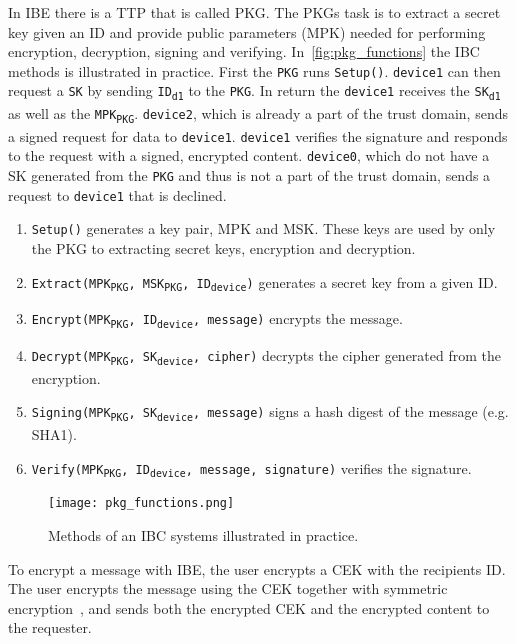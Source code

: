In \gls{IBE} there is a \gls{TTP} that is called \gls{PKG}.
The \gls{PKG}s task is to extract a secret key given an \gls{ID} and provide public parameters (\gls{MPK}) needed for performing encryption, decryption, signing and verifying. In~\autoref{fig:pkg_functions} the \gls{IBC} methods is illustrated in practice. 
First the \texttt{PKG} runs \texttt{Setup()}. 
\texttt{device1} can then request a \texttt{SK} by sending \texttt{ID\textsubscript{d1}} to the \texttt{PKG}. 
In return the \texttt{device1} receives the \texttt{SK\textsubscript{d1}} as well as the \texttt{MPK\textsubscript{PKG}}.
\texttt{device2}, which is already a part of the trust domain, sends a signed request for \gls{data} to \texttt{device1}. 
\texttt{device1} verifies the signature and responds to the request with a signed, encrypted content.
\texttt{device0}, which do not have a \gls{SK} generated from the \texttt{PKG} and thus is not a part of the trust domain, sends a request to \texttt{device1} that is declined.

\begin{enumerate}\label{ibc-methods}
  \item \texttt{Setup()} generates a key pair, \gls{MPK} and \gls{MSK}. 
  These keys are used by only the \gls{PKG} to extracting secret keys, encryption and decryption.
  \item \texttt{Extract(MPK\textsubscript{PKG}, MSK\textsubscript{PKG}, ID\textsubscript{device})} generates a secret key from a given ID. 
  \item \texttt{Encrypt(MPK\textsubscript{PKG}, ID\textsubscript{device}, message)} encrypts the message.
  \item \texttt{Decrypt(MPK\textsubscript{PKG}, SK\textsubscript{device}, cipher)} decrypts the cipher generated from the encryption.
  \item \texttt{Signing(MPK\textsubscript{PKG}, SK\textsubscript{device}, message)} signs a hash digest of the message (e.g. \gls{SHA1}).
  \item \texttt{Verify(MPK\textsubscript{PKG}, ID\textsubscript{device}, message, signature)} verifies the signature.
\end{enumerate}

\begin{figure}[ht]
  \centering
  \texttt{[image: pkg\_functions.png]}
  \caption{Methods of an IBC systems illustrated in practice.}
  \label{fig:pkg_functions}
\end{figure}

To encrypt a message with \gls{IBE}, the user encrypts a \gls{CEK} with the recipients \gls{ID}.
The user encrypts the message using the \gls{CEK} together with symmetric encryption~\cite[section 2.2.2]{rfc5408}, and sends both the encrypted \gls{CEK} and the encrypted content to the requester. 



